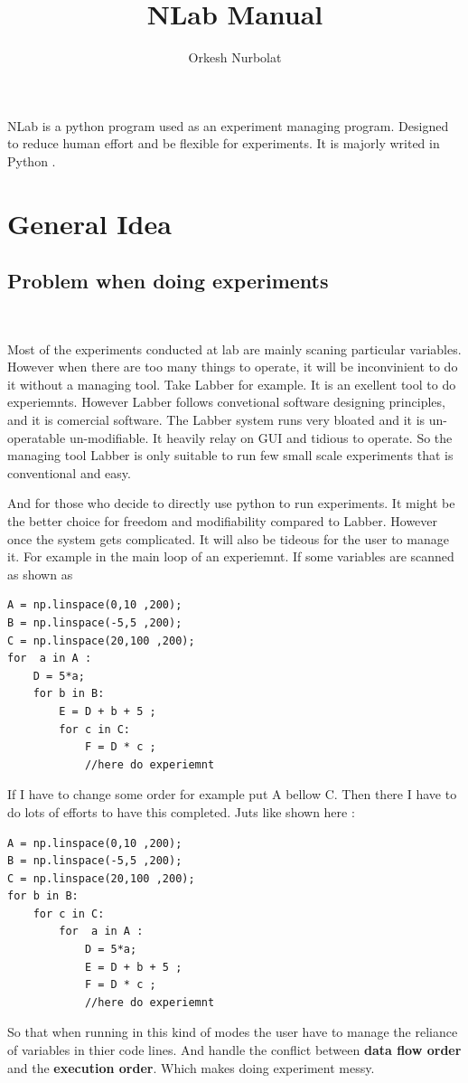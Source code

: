 \documentclass{article}
\begin{document}
\title{NLab Manual}
\author{Orkesh Nurbolat}
\maketitle

NLab is a python program used as an experiment managing program.
Designed to reduce human effort and be flexible for experiments. 
It is majorly writed in Python .

\section{General Idea}

\subsection{Problem when doing experiments}
~

Most of the experiments conducted at lab are 
	mainly scaning particular variables.
However when there are too many things to operate,
	it will be inconvinient to do it without a managing tool.
Take Labber for example. It is an exellent tool to do experiemnts.
However Labber follows convetional software designing principles,
	and it is comercial software.
The Labber system runs very bloated and it is un-operatable un-modifiable.
It heavily relay on GUI and tidious to operate. 
So the managing tool Labber is only suitable to run few small scale experiments
that is conventional and easy.

And for those who decide to directly use python to run experiments.
It might be the better choice for freedom and modifiability compared
to Labber.
However once the system gets complicated. It will also be tideous for
	the user to manage it. 
For example in the main loop of an experiemnt.
	If some variables are scanned as shown as



\begin{lstlisting}
A = np.linspace(0,10 ,200);
B = np.linspace(-5,5 ,200);
C = np.linspace(20,100 ,200);
for  a in A : 
	D = 5*a;
	for b in B: 
		E = D + b + 5 ;
		for c in C: 
			F = D * c ;
			//here do experiemnt
\end{lstlisting}

If I have to change some order for example put A bellow C.
Then there I have to do lots of efforts to have this completed.
Juts like shown here : 

\begin{lstlisting}
A = np.linspace(0,10 ,200);
B = np.linspace(-5,5 ,200);
C = np.linspace(20,100 ,200);
for b in B: 
	for c in C: 
		for  a in A : 
			D = 5*a;
			E = D + b + 5 ;
			F = D * c ;
			//here do experiemnt
\end{lstlisting}
So that when running in this kind of modes the user have to
manage the reliance of variables in thier code lines.
And handle the conflict between {\bf data flow order} and the {\bf execution order}.
Which makes doing experiment messy.
\end{document}
